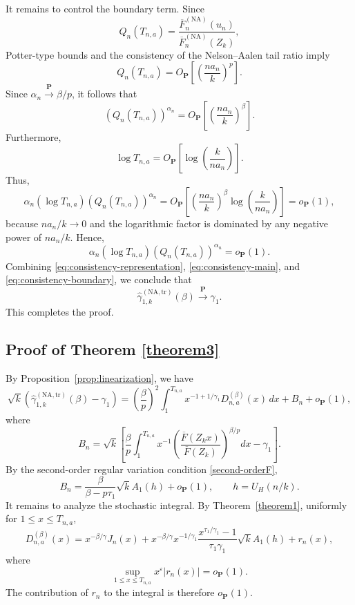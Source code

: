 \documentclass[reqno,openbib,runningheads,a4paper,12pt]{amsart}%
\begin{document}
It remains to control the boundary term. Since
\[
Q_{n}(T_{n,a})=\frac{\overline{F}_{n}^{(\mathrm{NA})}(u_{n})}{\overline{F}%
_{n}^{(\mathrm{NA})}(Z_{k})},
\]
Potter-type bounds and the consistency of the Nelson--Aalen tail ratio imply
\[
Q_{n}(T_{n,a})=O_{\mathbf{P}}\!\left[  \left(  \frac{na_{n}}{k}\right)
^{p}\right]  .
\]
Since $\alpha_{n}\overset{\mathbf{P}}{\longrightarrow}\beta/p$, it follows
that
\[
\left(  Q_{n}(T_{n,a})\right)  ^{\alpha_{n}}=O_{\mathbf{P}}\!\left[  \left(
\frac{na_{n}}{k}\right)  ^{\beta}\right]  .
\]
Furthermore,
\[
\log T_{n,a}=O_{\mathbf{P}}\!\left[  \log\!\left(  \frac{k}{na_{n}}\right)
\right]  .
\]
Thus,
\[
\alpha_{n}(\log T_{n,a})\left(  Q_{n}(T_{n,a})\right)  ^{\alpha_{n}%
}=O_{\mathbf{P}}\!\left[  \left(  \frac{na_{n}}{k}\right)  ^{\beta}%
\log\!\left(  \frac{k}{na_{n}}\right)  \right]  =o_{\mathbf{P}}(1),
\]
because $na_{n}/k\rightarrow0$ and the logarithmic factor is dominated by any
negative power of $na_{n}/k$. Hence,
\begin{equation}
\alpha_{n}(\log T_{n,a})\left(  Q_{n}(T_{n,a})\right)  ^{\alpha_{n}%
}=o_{\mathbf{P}}(1). \label{eq:consistency-boundary}%
\end{equation}
Combining \eqref{eq:consistency-representation}, \eqref{eq:consistency-main},
and \eqref{eq:consistency-boundary}, we conclude that
\[
\widehat{\gamma}_{1,k}^{(\mathrm{NA,tr})}(\beta)\overset{\mathbf{P}%
}{\longrightarrow}\gamma_{1}.
\]
This completes the proof.

\subsection{\textbf{Proof of Theorem} \ref{theorem3}}

\noindent By Proposition~\ref{prop:linearization}, we have
\[
\sqrt{k}\left(  \widehat{\gamma}_{1,k}^{(\mathrm{NA,tr})}(\beta)-\gamma
_{1}\right)  =\left(  \frac{\beta}{p}\right)  ^{2}\int_{1}^{T_{n,a}%
}x^{-1+1/\gamma_{1}}D_{n,a}^{(\beta)}(x)\,dx+B_{n}+o_{\mathbf{P}}(1),
\]
where
\[
B_{n}=\sqrt{k}\left[  \frac{\beta}{p}\int_{1}^{T_{n,a}}x^{-1}\left(
\frac{\overline{F}(Z_{k}x)}{\overline{F}(Z_{k})}\right)  ^{\beta/p}%
dx-\gamma_{1}\right]  .
\]
By the second-order regular variation condition \eqref{second-orderF},
\[
B_{n}=\frac{\beta}{\beta-p\tau_{1}}\sqrt{k}A_{1}(h)+o_{\mathbf{P}}(1),\qquad
h=U_{H}(n/k).
\]
It remains to analyze the stochastic integral. By Theorem~\ref{theorem1},
uniformly for $1\leq x\leq T_{n,a}$,
\[
D_{n,a}^{(\beta)}(x)=x^{-\beta/\gamma}J_{n}(x)+x^{-\beta/\gamma}%
x^{-1/\gamma_{1}}\frac{x^{\tau_{1}/\gamma_{1}}-1}{\tau_{1}\gamma_{1}}\sqrt
{k}A_{1}(h)+r_{n}(x),
\]
where
\[
\sup_{1\leq x\leq T_{n,a}}x^{\varepsilon}|r_{n}(x)|=o_{\mathbf{P}}(1).
\]
The contribution of $r_{n}$ to the integral is therefore $o_{\mathbf{P}}%
(1)$.\smallskip
\end{document}

